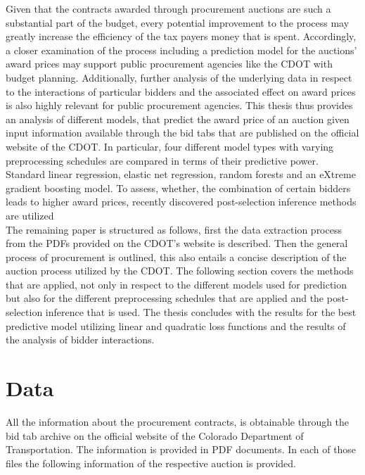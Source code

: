 \documentclass[a4paper,12pt, headsepline]{scrartcl}
\numberwithin{equation}{section}
\begin{document}
Given that the contracts awarded through procurement auctions are such a substantial part of the budget, every potential improvement to the process may greatly increase the efficiency of the tax payers money that is spent. Accordingly, a closer examination of the process including a prediction model for the auctions' award prices may support public procurement agencies like the CDOT with budget planning. Additionally, further analysis of the underlying data in respect to the interactions of particular bidders and the associated effect on award prices is also highly relevant for public procurement agencies. This thesis thus provides an analysis of different models, that predict the award price of an auction given input information available through the bid tabs that are published on the official website of the CDOT. In particular, four different model types with varying preprocessing schedules are compared in terms of their predictive power. Standard linear regression, elastic net regression, random forests and an eXtreme gradient boosting model. To assess, whether, the combination of certain bidders leads to higher award prices, recently discovered post-selection inference methods are utilized \citep{selectiveInference}\\
The remaining paper is structured as follows, first the data extraction process from the PDFs provided on the CDOT's website is described. Then the general process of procurement is outlined, this also entails a concise description of the auction process utilized by the CDOT. The following section covers the methods that are applied, not only in respect to the different models used for prediction but also for the different preprocessing schedules that are applied and the post-selection inference that is used. The thesis concludes with the results for the best predictive model utilizing linear and quadratic loss functions and the results of the analysis of bidder interactions.

\section{Data}\label{sec:data}

All the information about the procurement contracts, is obtainable through the bid tab archive on the official website of the Colorado Department of Transportation. The information is provided in PDF documents. In each of those files the following information of the respective auction is provided.
\end{document}
